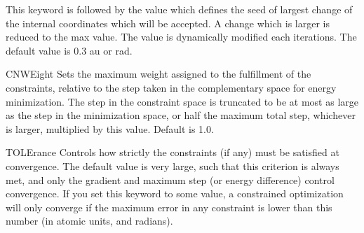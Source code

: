 \begin{keywordlist}
This keyword is followed by the value which defines the seed of largest
change of the internal coordinates which will be accepted. A
change which is larger is reduced to the max value. The value is dynamically modified each iterations.
The default value is 0.3 au or rad.
\item[CNWEight]
Sets the maximum weight assigned to the fulfillment of the constraints, relative to the step taken in the
complementary space for energy minimization. The step in the constraint space is truncated to be at most as
large as the step in the minimization space, or half the maximum total step, whichever is larger, multiplied
by this value. Default is 1.0.
\item[TOLErance]
Controls how strictly the constraints (if any) must be satisfied at convergence. The default value
is very large, such that this criterion is always met, and only the gradient and maximum step (or
energy difference) control convergence. If you set this keyword to some value, a constrained optimization
will only converge if the maximum error in any constraint is lower than this number (in atomic units,
and radians).
\end{keywordlist}

